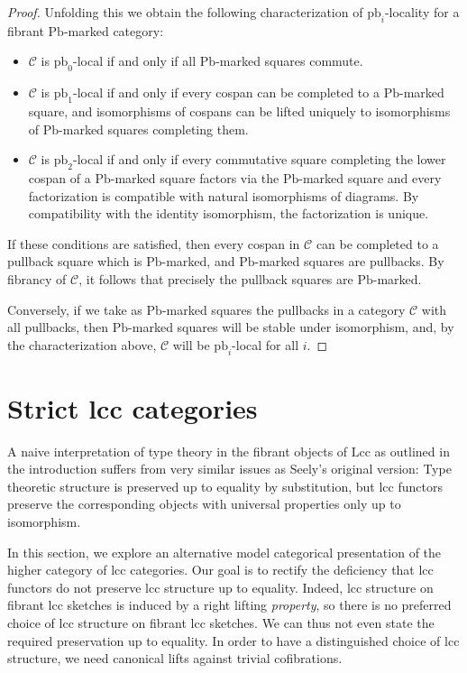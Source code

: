 \documentclass[a4paper]{article}
\theoremstyle{remark}
\theoremstyle{definition}
\begin{document}
\begin{proof}
  Unfolding this we obtain the following characterization of $\mathrm{pb}_i$-locality for a fibrant $\mathrm{Pb}$-marked category:
  \begin{itemize}
    \item
      $\mathcal{C}$ is $\mathrm{pb}_0$-local if and only if all $\mathrm{Pb}$-marked squares commute.
    \item
      $\mathcal{C}$ is $\mathrm{pb}_1$-local if and only if every cospan can be completed to a $\mathrm{Pb}$-marked square, and isomorphisms of cospans can be lifted uniquely to isomorphisms of $\mathrm{Pb}$-marked squares completing them.
    \item
      $\mathcal{C}$ is $\mathrm{pb}_2$-local if and only if every commutative square completing the lower cospan of a $\mathrm{Pb}$-marked square factors via the $\mathrm{Pb}$-marked square and every factorization is compatible with natural isomorphisms of diagrams.
      By compatibility with the identity isomorphism, the factorization is unique.
  \end{itemize}
  If these conditions are satisfied, then every cospan in $\mathcal{C}$ can be completed to a pullback square which is $\mathrm{Pb}$-marked, and $\mathrm{Pb}$-marked squares are pullbacks.
  By fibrancy of $\mathcal{C}$, it follows that precisely the pullback squares are $\mathrm{Pb}$-marked.

  Conversely, if we take as $\mathrm{Pb}$-marked squares the pullbacks in a category $\mathcal{C}$ with all pullbacks, then $\mathrm{Pb}$-marked squares will be stable under isomorphism, and, by the characterization above, $\mathcal{C}$ will be $\mathrm{pb}_i$-local for all $i$.
\end{proof}

\section{Strict lcc categories}
\label{sec:slcc}

A naive interpretation of type theory in the fibrant objects of $\mathrm{Lcc}$ as outlined in the introduction suffers from very similar issues as Seely's original version:
Type theoretic structure is preserved up to equality by substitution, but lcc functors preserve the corresponding objects with universal properties only up to isomorphism.

In this section, we explore an alternative model categorical presentation of the higher category of lcc categories.
Our goal is to rectify the deficiency that lcc functors do not preserve lcc structure up to equality.
Indeed, lcc structure on fibrant lcc sketches is induced by a right lifting \emph{property}, so there is no preferred choice of lcc structure on fibrant lcc sketches. 
We can thus not even state the required preservation up to equality.
In order to have a distinguished choice of lcc structure, we need canonical lifts against trivial cofibrations.
\end{document}
